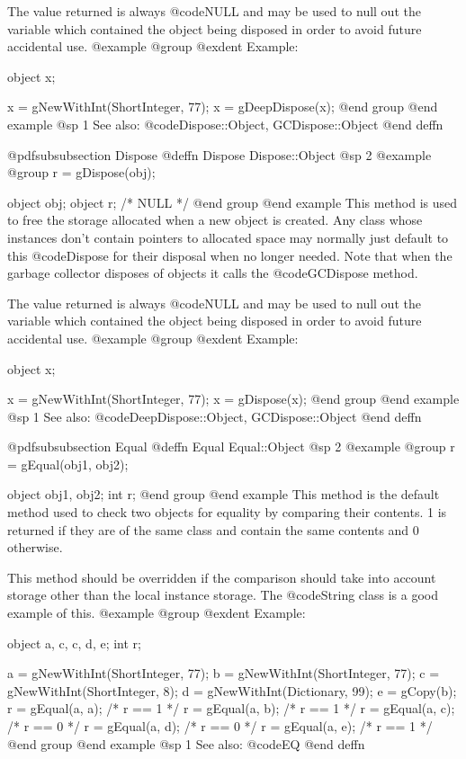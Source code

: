 The value returned is always @code{NULL} and may be used to null out
the variable which contained the object being disposed in order to
avoid future accidental use.
@example
@group
@exdent Example:

object  x;

x = gNewWithInt(ShortInteger, 77);
x = gDeepDispose(x);
@end group
@end example
@sp 1
See also:  @code{Dispose::Object, GCDispose::Object}
@end deffn





@pdfsubsubsection {Dispose}
@deffn {Dispose} Dispose::Object
@sp 2
@example
@group
r = gDispose(obj);

object  obj;
object  r;     /*  NULL  */
@end group
@end example
This method is used to free the storage allocated when a new object is
created.  Any class whose instances don't contain pointers to allocated
space may normally just default to this @code{Dispose} for their
disposal when no longer needed.  Note that when the garbage collector
disposes of objects it calls the @code{GCDispose} method.

The value returned is always @code{NULL} and may be used to null out
the variable which contained the object being disposed in order to
avoid future accidental use.
@example
@group
@exdent Example:

object  x;

x = gNewWithInt(ShortInteger, 77);
x = gDispose(x);
@end group
@end example
@sp 1
See also:  @code{DeepDispose::Object, GCDispose::Object}
@end deffn











@pdfsubsubsection {Equal}
@deffn {Equal} Equal::Object
@sp 2
@example
@group
r = gEqual(obj1, obj2);

object  obj1, obj2;
int     r;
@end group
@end example
This method is the default method used to check two objects for equality
by comparing their contents.  1 is returned if they are of the same
class and contain the same contents and 0 otherwise.

This method should be overridden if the comparison should take
into account storage other than the local instance storage.  The
@code{String} class is a good example of this.
@example
@group
@exdent Example:

object  a, c, c, d, e;
int     r;

a = gNewWithInt(ShortInteger, 77);
b = gNewWithInt(ShortInteger, 77);
c = gNewWithInt(ShortInteger, 8);
d = gNewWithInt(Dictionary, 99);
e = gCopy(b);
r = gEqual(a, a);   /*  r == 1  */
r = gEqual(a, b);   /*  r == 1  */
r = gEqual(a, c);   /*  r == 0  */
r = gEqual(a, d);   /*  r == 0  */
r = gEqual(a, e);   /*  r == 1  */
@end group
@end example
@sp 1
See also:  @code{EQ}
@end deffn










